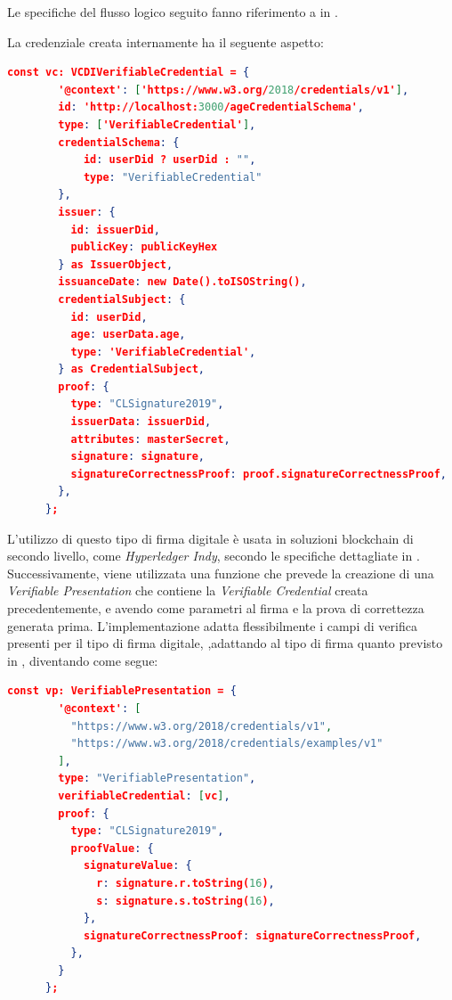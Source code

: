 Le specifiche del flusso logico seguito fanno riferimento a in \cite{site:clsignature2}.

La credenziale creata internamente ha il seguente aspetto:
\begin{lstlisting}[language=json]
    const vc: VCDIVerifiableCredential = {
        '@context': ['https://www.w3.org/2018/credentials/v1'],
        id: 'http://localhost:3000/ageCredentialSchema',
        type: ['VerifiableCredential'],
        credentialSchema: { 
            id: userDid ? userDid : "",
            type: "VerifiableCredential"
        },        
        issuer: {
          id: issuerDid,
          publicKey: publicKeyHex 
        } as IssuerObject,
        issuanceDate: new Date().toISOString(),
        credentialSubject: {
          id: userDid,
          age: userData.age,
          type: 'VerifiableCredential',
        } as CredentialSubject,
        proof: {
          type: "CLSignature2019", 
          issuerData: issuerDid, 
          attributes: masterSecret,
          signature: signature,
          signatureCorrectnessProof: proof.signatureCorrectnessProof,
        },
      };
\end{lstlisting}
L'utilizzo di questo tipo di firma digitale è usata in soluzioni blockchain di secondo livello, come \textit{Hyperledger Indy}, 
secondo le specifiche dettagliate in \cite{site:clsignature}. \\

Successivamente, viene utilizzata una funzione che prevede la creazione di una \textit{Verifiable Presentation} che contiene la \textit{Verifiable Credential} creata precedentemente,
e avendo come parametri al firma e la prova di correttezza generata prima. L'implementazione adatta flessibilmente i campi di verifica presenti per il tipo di firma digitale, 
,adattando al tipo di firma quanto previsto in \cite{site:vpw3c}, diventando come segue:
\begin{lstlisting}[language=json]
    const vp: VerifiablePresentation = {
        '@context': [
          "https://www.w3.org/2018/credentials/v1",
          "https://www.w3.org/2018/credentials/examples/v1"
        ],
        type: "VerifiablePresentation",
        verifiableCredential: [vc],
        proof: {
          type: "CLSignature2019",
          proofValue: {
            signatureValue: {
              r: signature.r.toString(16),
              s: signature.s.toString(16),
            },
            signatureCorrectnessProof: signatureCorrectnessProof,
          },
        }
      };
\end{lstlisting}

